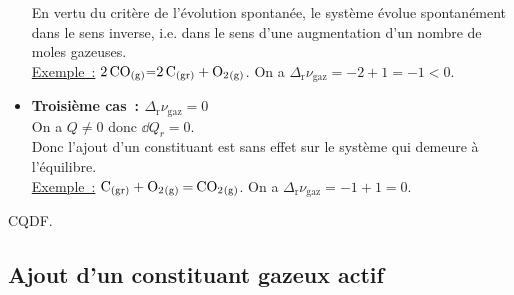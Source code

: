 \documentclass{article}
\newcommand{\Dr}{\Delta_{\mathrm{r}}}
\newcommand{\gaz}{\text{gaz}}
\begin{document}
\begin{tableau}
\begin{itemize}
        En vertu du critère de l'évolution spontanée, le système évolue spontanément dans le sens inverse, i.e. dans le sens d'une augmentation d'un nombre de moles gazeuses.\\
        \underline{Exemple~:} $\ce{2 CO_{(g)}=2C_{(gr)} + O2_{(g)} }$. On a $\Dr \nu_{\gaz}=-2+1=-1<0$.
        \item \textbf{Troisième cas~: $\Dr \nu_{\gaz}=0$}\\
        On a $Q\neq 0$ donc $\dd{Q_r} = 0$.\\
        Donc l'ajout d'un constituant est sans effet sur le système qui demeure à l'équilibre.\\
        \underline{Exemple~:} $\ce{C_{(gr)} + O2_{(g)} = CO2_{(g)}}$. On a $\Dr \nu_{\gaz}=-1+1=0$.
    \end{itemize}
    CQDF.
\end{tableau}
\subsection{Ajout d’un constituant gazeux actif}
\end{document}
